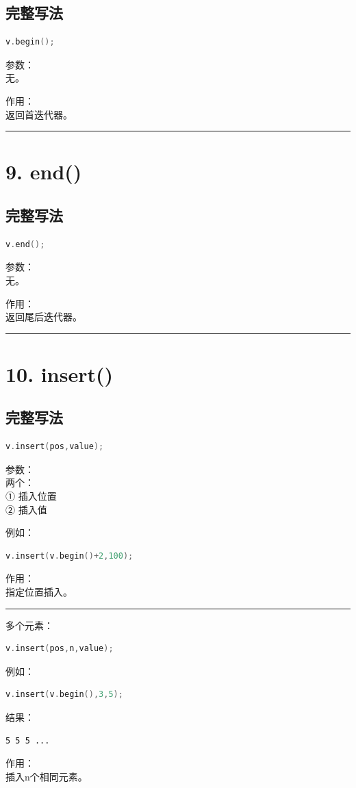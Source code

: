 \documentclass[9pt,twocolumn]{extarticle}
\begin{document}
\subsection{完整写法}
\begin{lstlisting}[language=C++]
v.begin();
\end{lstlisting}
参数：\\
无。

作用：\\
返回首迭代器。

\noindent\rule{\linewidth}{0.4pt}

\section{9. end()}

\subsection{完整写法}
\begin{lstlisting}[language=C++]
v.end();
\end{lstlisting}
参数：\\
无。

作用：\\
返回尾后迭代器。

\noindent\rule{\linewidth}{0.4pt}

\section{10. insert()}

\subsection{完整写法}
\begin{lstlisting}[language=C++]
v.insert(pos,value);
\end{lstlisting}
参数：\\
两个：\\
① 插入位置\\
② 插入值

例如：
\begin{lstlisting}[language=C++]
v.insert(v.begin()+2,100);
\end{lstlisting}
作用：\\
指定位置插入。

\noindent\rule{\linewidth}{0.4pt}

多个元素：
\begin{lstlisting}[language=C++]
v.insert(pos,n,value);
\end{lstlisting}
例如：
\begin{lstlisting}[language=C++]
v.insert(v.begin(),3,5);
\end{lstlisting}
结果：
\begin{lstlisting}
5 5 5 ...
\end{lstlisting}
作用：\\
插入n个相同元素。
\end{document}
